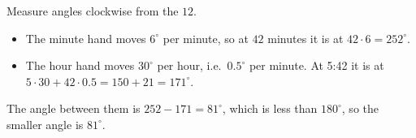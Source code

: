 Measure angles clockwise from the $12$.
\begin{itemize}
\item The minute hand moves $6^\circ$ per minute, so at $42$ minutes it is at $42\cdot6=252^\circ$.
\item The hour hand moves $30^\circ$ per hour, i.e.\ $0.5^\circ$ per minute. At 5:42 it is at $5\cdot30+42\cdot0.5=150+21=171^\circ$.
\end{itemize}
The angle between them is $252-171=81^\circ$, which is less than $180^\circ$, so the smaller angle is $\boxed{81^\circ}$.
